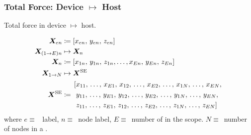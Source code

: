 		\subsubsection{Total Force: Device $ \mapsto $ Host}
			\begin{algorithm}
				\caption{Total force in device $ \mapsto $ host.}
				\begin{algorithmic}[1]
						 
						 
							 
							\EndFor
						\EndFor
					\EndFunction
				\end{algorithmic}
			\end{algorithm}
	\begin{subequations}\label{e:fcne}
		\begin{align}
			\vec{X}_{en}			&\coloneqq	\left[x_{en},\, y_{en},\, z_{en}\right]\\
			\vec{X}_{(1\to E)n}		&\mapsto 	\vec{X}_{n} \nn
			\vec{X}_{n}				&\coloneqq	\left[x_{1n},\, y_{1n},\, z_{1n},\ldots,x_{En},\, y_{En},\, z_{En}\right]\label{se:xn_arr}\\
			\vec{X}_{1\to N}		&\mapsto	\vec{X}^{\textrm{SE}}\nn
			\vec{X}^{\textrm{SE}}	&\coloneqq 
			\begin{aligned}
				&\left[x_{11},\, \ldots,\, x_{E1},\, x_{12},\, \ldots,\, x_{E2},\, \ldots,\, x_{1N},\, \ldots,\, x_{EN}, \right.\\
				&\left.\,y_{11},\, \ldots,\, y_{E1},\, y_{12},\, \ldots,\, y_{E2},\, \ldots,\, y_{1N},\, \ldots,\, y_{EN}, \right.\\
				&\left.\,z_{11},\, \ldots,\, z_{E1},\, z_{12},\, \ldots,\, z_{E2},\, \ldots,\, z_{1N},\, \ldots,\, z_{EN}  \right]
			\end{aligned}
		\end{align}
	\end{subequations}
	where $ e\equiv $~ label, $ n \equiv $~node label, $ E \equiv $~number of  in the scope. $ N \equiv $~number of nodes in a .
	
